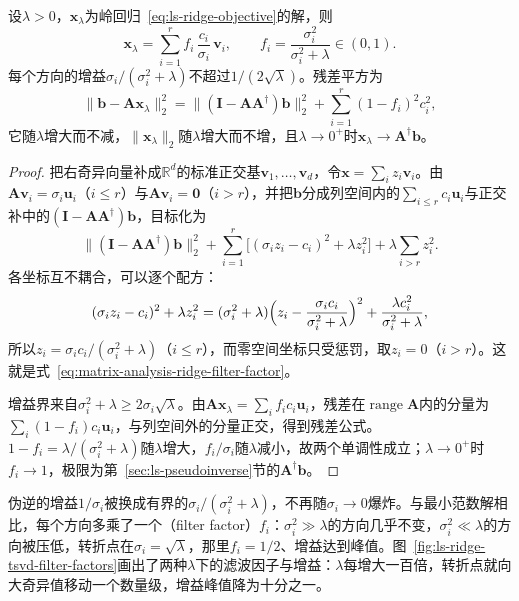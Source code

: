 \begin{theorem}[岭回归的滤波因子]
\label{thm:ls-ridge-filter-factors}
设$\lambda>0$，$\bm x_\lambda$为岭回归~\eqref{eq:ls-ridge-objective}的解，则
\begin{equation}
 \bm x_\lambda=\sum_{i=1}^r f_i\,\frac{c_i}{\sigma_i}\,\bm v_i,\qquad
 f_i=\frac{\sigma_i^2}{\sigma_i^2+\lambda}\in(0,1).
 \label{eq:matrix-analysis-ridge-filter-factor}
\end{equation}
每个方向的增益$\sigma_i/(\sigma_i^2+\lambda)$不超过$1/(2\sqrt\lambda)$。残差平方为
\[
 \lVert\bm b-\bm A\bm x_\lambda\rVert_2^2=\lVert(\bm I-\bm A\bm A^\dagger)\bm b\rVert_2^2+\sum_{i=1}^r(1-f_i)^2c_i^2,
\]
它随$\lambda$增大而不减，$\lVert\bm x_\lambda\rVert_2$随$\lambda$增大而不增，且$\lambda\to0^+$时$\bm x_\lambda\to\bm A^\dagger\bm b$。
\end{theorem}
\begin{proof}
把右奇异向量补成$\mathbb R^d$的标准正交基$\bm v_1,\ldots,\bm v_d$，令$\bm x=\sum_iz_i\bm v_i$。由$\bm A\bm v_i=\sigma_i\bm u_i$（$i\leq r$）与$\bm A\bm v_i=\bm0$（$i>r$），并把$\bm b$分成列空间内的$\sum_{i\leq r}c_i\bm u_i$与正交补中的$(\bm I-\bm A\bm A^\dagger)\bm b$，目标化为
\[
\lVert(\bm I-\bm A\bm A^\dagger)\bm b\rVert_2^2+\sum_{i=1}^r\bigl[(\sigma_iz_i-c_i)^2+\lambda z_i^2\bigr]+\lambda\sum_{i>r}z_i^2 .
\]
各坐标互不耦合，可以逐个配方：
\[
(\sigma_iz_i-c_i)^2+\lambda z_i^2=(\sigma_i^2+\lambda)\Bigl(z_i-\frac{\sigma_ic_i}{\sigma_i^2+\lambda}\Bigr)^2+\frac{\lambda c_i^2}{\sigma_i^2+\lambda},
\]
所以$z_i=\sigma_ic_i/(\sigma_i^2+\lambda)$（$i\leq r$），而零空间坐标只受惩罚，取$z_i=0$（$i>r$）。这就是式~\eqref{eq:matrix-analysis-ridge-filter-factor}。

增益界来自$\sigma_i^2+\lambda\geq2\sigma_i\sqrt\lambda$。由$\bm A\bm x_\lambda=\sum_if_ic_i\bm u_i$，残差在$\operatorname{range}\bm A$内的分量为$\sum_i(1-f_i)c_i\bm u_i$，与列空间外的分量正交，得到残差公式。$1-f_i=\lambda/(\sigma_i^2+\lambda)$随$\lambda$增大，$f_i/\sigma_i$随$\lambda$减小，故两个单调性成立；$\lambda\to0^+$时$f_i\to1$，极限为第~\ref{sec:ls-pseudoinverse}节的$\bm A^\dagger\bm b$。
\end{proof}

伪逆的增益$1/\sigma_i$被换成有界的$\sigma_i/(\sigma_i^2+\lambda)$，不再随$\sigma_i\to0$爆炸。与最小范数解相比，每个方向多乘了一个（filter factor）$f_i$：$\sigma_i^2\gg\lambda$的方向几乎不变，$\sigma_i^2\ll\lambda$的方向被压低，转折点在$\sigma_i=\sqrt\lambda$，那里$f_i=1/2$、增益达到峰值。图~\ref{fig:ls-ridge-tsvd-filter-factors}画出了两种$\lambda$下的滤波因子与增益：$\lambda$每增大一百倍，转折点就向大奇异值移动一个数量级，增益峰值降为十分之一。

